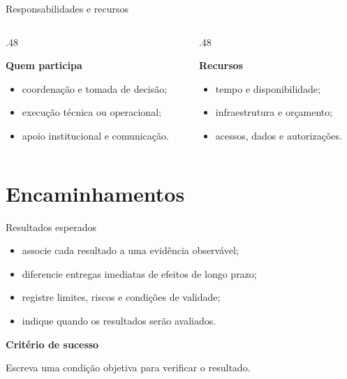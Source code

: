 \documentclass[aspectratio=169,11pt]{beamer}
\begin{document}
\begin{frame}{Responsabilidades e recursos}
  \begin{columns}[T,onlytextwidth]
    \begin{column}{.48\textwidth}
      {\IEEECSHeadingFont\bfseries\color{IEEEBlue}Quem participa\par}
      \begin{itemize}
        \item coordenação e tomada de decisão;
        \item execução técnica ou operacional;
        \item apoio institucional e comunicação.
      \end{itemize}
    \end{column}
    \begin{column}{.48\textwidth}
      {\IEEECSHeadingFont\bfseries\color{IEEEBlue}Recursos\par}
      \begin{itemize}
        \item tempo e disponibilidade;
        \item infraestrutura e orçamento;
        \item acessos, dados e autorizações.
      \end{itemize}
    \end{column}
  \end{columns}
\end{frame}

\section{Encaminhamentos}

\begin{frame}{Resultados esperados}
  \begin{itemize}
    \item associe cada resultado a uma evidência observável;
    \item diferencie entregas imediatas de efeitos de longo prazo;
    \item registre limites, riscos e condições de validade;
    \item indique quando os resultados serão avaliados.
  \end{itemize}
  \vfill
  {\IEEECSHeadingFont\bfseries\color{IEEEBlue}Critério de sucesso\par}
  \smallskip
  Escreva uma condição objetiva para verificar o resultado.
\end{frame}
\end{document}
